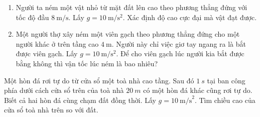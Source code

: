 \begin{ex}
	\begin{enumerate}[label=\alph*)]
		\item Người ta ném một vật nhỏ từ mặt đất lên cao theo phương thẳng đứng với tốc độ đầu $\SI{8}{\meter/\second}$. Lấy $g=\SI{10}{\meter/\second^2}$. Xác định độ cao cực đại mà vật đạt được.
		\item Một người thợ xây ném một viên gạch theo phương thẳng đứng cho một người khác ở trên tầng cao $\SI{4}{\meter}$. Người này chỉ việc giơ tay ngang ra là bắt được viên gạch. Lấy $g=\SI{10}{\meter/\second^2}$. Để cho viên gạch lúc người kia bắt được bằng không thì vận tốc lúc ném là bao nhiêu?
	\end{enumerate}
\end{ex}

\begin{ex}
	Một hòn đá rơi tự do từ cửa sổ một toà nhà cao tầng. Sau đó $\SI{1}{s}$ tại ban công phía dưới cách cửa sổ trên của toà nhà $\SI{20}{m}$ có một hòn đá khác cũng rơi tự do. Biết cả hai hòn đá cùng chạm đất đồng thời. Lấy $g=10\ \text{m/s}^2$. Tìm chiều cao của cửa sổ toà nhà trên so với đất.	
\end{ex}


